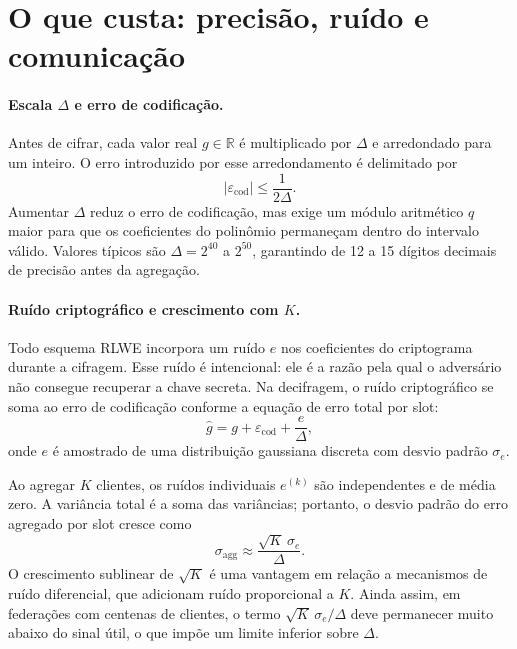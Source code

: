 \documentclass[11pt,a4paper]{article}
\begin{document}
\section{O que custa: precisão, ruído e comunicação}
\label{sec:custos}

\paragraph{Escala $\Delta$ e erro de codificação.}
Antes de cifrar, cada valor real $g \in \mathbb{R}$ é multiplicado por $\Delta$ e
arredondado para um inteiro. O erro introduzido por esse arredondamento é delimitado
por
\begin{equation}
  |\varepsilon_{\text{cod}}| \leq \frac{1}{2\Delta}.
  \label{eq:enc_error}
\end{equation}
Aumentar $\Delta$ reduz o erro de codificação, mas exige um módulo aritmético $q$
maior para que os coeficientes do polinômio permaneçam dentro do intervalo válido.
Valores típicos são $\Delta = 2^{40}$ a $2^{50}$, garantindo de 12 a 15 dígitos
decimais de precisão antes da agregação.

\paragraph{Ruído criptográfico e crescimento com $K$.}
Todo esquema RLWE incorpora um ruído $e$ nos coeficientes do criptograma durante a
cifragem. Esse ruído é intencional: ele é a razão pela qual o adversário não consegue
recuperar a chave secreta. Na decifragem, o ruído criptográfico se soma ao erro de
codificação conforme a equação de erro total por slot:
\begin{equation}
  \hat{g} = g + \varepsilon_{\text{cod}} + \frac{e}{\Delta},
  \label{eq:total_error}
\end{equation}
onde $e$ é amostrado de uma distribuição gaussiana discreta com desvio padrão $\sigma_e$.

Ao agregar $K$ clientes, os ruídos individuais $e^{(k)}$ são independentes e de média
zero. A variância total é a soma das variâncias; portanto, o desvio padrão do erro
agregado por slot cresce como
\begin{equation}
  \sigma_{\text{agg}} \approx \frac{\sqrt{K}\,\sigma_e}{\Delta}.
  \label{eq:noise_agg}
\end{equation}
O crescimento sublinear de $\sqrt{K}$ é uma vantagem em relação a mecanismos de ruído
diferencial, que adicionam ruído proporcional a $K$. Ainda assim, em federações com
centenas de clientes, o termo $\sqrt{K}\,\sigma_e/\Delta$ deve permanecer muito abaixo
do sinal útil, o que impõe um limite inferior sobre $\Delta$.
\end{document}
